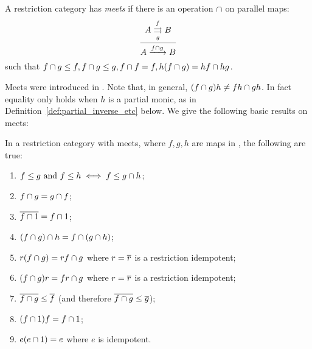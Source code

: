 \begin{definition}\label{def:meet_in_a_restriction_category}
  A restriction category has \emph{meets} if there is an operation $\cap$ on parallel maps:
  \[
    \infer{A\xrightarrow{f\meet g} B}
      {A\overset{f}{\underset{g}{\rightrightarrows}}B}
  \]
  such that $f\cap g \le f, f\cap g \le g, f\cap f = f, h (f\cap g) = h f \cap h g$.
\end{definition}

Meets were introduced in \cite{cockett-guo-hofstra-2012:range2}. Note that, in general,
$(f \cap g) h \ne f h \cap g h$. In fact equality only holds when $h$ is a partial monic, as in
Definition~\ref{def:partial_inverse_etc} below.
We give the following basic results on meets:

\begin{lemma}
  \label{lem:properties_of_meets_in_restriction_categories}
  In a restriction category \X with meets, where $f, g, h$ are maps in
  \X, the following are true:
  \begin{enumerate}[{(}i{)}]
    \item $f\le g \text{ and } f \le h \iff f \le g\cap h$;
        \label{lemsub:properties_of_meets_one}
    \item $f\cap g = g \cap f$;\label{lemsub:properties_of_meets_two}
    \item $\overline{f\cap 1} = f \cap 1$;\label{lemsub:properties_of_meets_three}
    \item $(f \cap g) \cap h = f \cap (g \cap h)$;
    \item $r(f\cap g) = r f \cap g$ where $r=\overline{r}$ is a restriction idempotent;
    \item $(f\cap g)r = f r \cap g$ where $r=\overline{r}$ is a restriction idempotent;
    \item $\overline{f\cap g} \le \overline{f}$ (and therefore $\overline{f\cap g} \le \overline{g}$);
    \item $ (f \cap 1) f = f \cap 1$;
    \item $ e(e \cap 1) = e$ where $e$ is idempotent.
  \end{enumerate}
\end{lemma}
